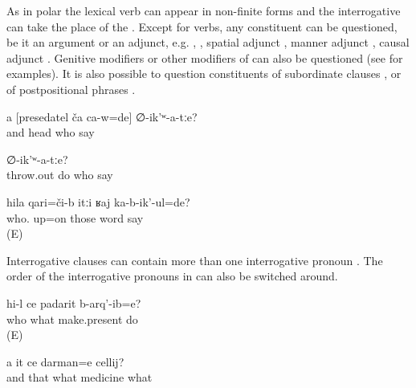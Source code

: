 As in polar  the lexical verb can appear in non-finite forms  and the interrogative  can take the place of the  . Except for verbs, any constituent can be questioned, be it an argument or an adjunct, e.g.  , , spatial adjunct , manner adjunct , causal adjunct . Genitive modifiers or other modifiers of  can also be questioned (see  for examples). It is also possible to question constituents of subordinate clauses ,  or of postpositional phrases .

\begin{exe}
	\ex	\label{ex:‎Who did you say was the head (of the kolkhoz)}
	\gll	a	[presedatel	ča 	ca-w=de]	∅-ik'ʷ-a-tːe?\\
		and	head	who		say\\
	\glt	{}

	\ex	\label{ex:The ones who were thrown out, who did you (masc.) say was this}
		∅-ik'ʷ-a-tːe?\\
		throw.out	do 	who	say\\
	\glt	{}

	\ex	\label{ex:About whom were they talking}
	\gll	hila	qari=či-b	itːi	ʁaj	ka-b-ik'-ul=de?\\
		who.	up=on	those	word	say\\
	\glt	{} (E)
\end{exe}

Interrogative clauses can contain more than one interrogative pronoun . The order of the interrogative pronouns in  can also be switched around.

\begin{exe}
	\ex	\label{ex:Who did make which present}
	\gll	hi-l ce padarit b-arq'-ib=e?\\
		who	what	make.present	do\\
	\glt	{} (E)

	\ex	\label{ex:‎‎‎And this is what medicine for what}
	\gll	a	it	ce	darman=e	cellij?\\
		and	that	what	medicine	what\\
	\glt	{}
\end{exe}

